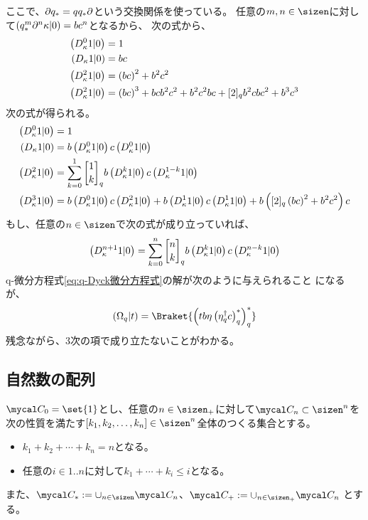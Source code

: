 {\begin{todo}[違うものを求めている]
	ここで、$\partial q_*=qq_*\partial$という交換関係を使っている。
	任意の$m,n\in\sizen$に対して$\left({q_*^m\partial^n\kappa|0}\right)=bc^n$となるから、
	次の式から、
	\begin{equation*}\begin{split}
		\left({D_\kappa^0 1|0}\right) &= 1 \\
		\left({D_\kappa 1|0}\right) &= bc \\
		\left({D_\kappa^2 1|0}\right) &= \left({bc}\right)^2 + b^2c^2 \\
		\left({D_\kappa^2 1|0}\right) &= \left({bc}\right)^3 + bcb^2c^2 + b^2c^2bc + [2]_qb^2cbc^2
			+ b^3c^3
	\end{split}\end{equation*}
	次の式が得られる。
	\begin{equation*}\begin{split}
		\lr{D_\kappa^0 1|0} &= 1 \\
		\lr{D_\kappa 1|0} &= b\lr{D_\kappa^0 1|0}c\lr{D_\kappa^0 1|0} \\
		\lr{D_\kappa^2 1|0} &= \sum_{k=0}^1\qbinom{1}{k}_q b\lr{D_\kappa^k 1|0}
			c\lr{D_\kappa^{1-k} 1|0} \\
		\lr{D_\kappa^3 1|0} &= b\lr{D_\kappa^0 1|0}c\lr{D_\kappa^2 1|0}
			+ b\lr{D_\kappa^1 1|0}c\lr{D_\kappa^1 1|0}
			+ b\lr{[2]_q\lr{bc}^2 + b^2c^2}c
	\end{split}\end{equation*}
	もし、任意の$n\in\sizen$で次の式が成り立っていれば、
	\begin{equation*}\begin{split}
		\lr{D_\kappa^{n+1} 1|0} &= \sum_{k=0}^n\qbinom{n}{k}_q 
			b\lr{D_\kappa^k 1|0} c\lr{D_\kappa^{n-k} 1|0} \\
	\end{split}\end{equation*}
	q-微分方程式\eqref{eq:q-Dyck微分方程式}の解が次のように与えられること
	になるが、
	\begin{equation*}\begin{split}
		\lr{\Omega_q|t} 
		= \Braket{\lr{tb\eta\lr{\eta_q^\dag c}_q^*}_q^*}
	\end{split}\end{equation*}
	残念ながら、$3$次の項で成り立たないことがわかる。
	\end{todo} %
\subsection{自然数の配列}\label{s2:自然数の配列} %
	$\C_0=\set{1}$とし、任意の$n\in\sizen_+$に対して$\C_n\subset\sizen^n$を
	次の性質を満たす$[k_1,k_2,\dots,k_n]\in\sizen^n$全体のつくる集合とする。
	\begin{itemize}\setlength{\itemsep}{-1mm} %
		\item $k_1+k_2+\cdots+k_n=n$となる。
		\item 任意の$i\in1..n$に対して$k_1+\cdots+k_i\le i$となる。
	\end{itemize} %
	また、$\C_*:=\cup_{n\in\sizen}\C_n$、$\C_+:=\cup_{n\in\sizen_+}\C_n$
	とする。

}
